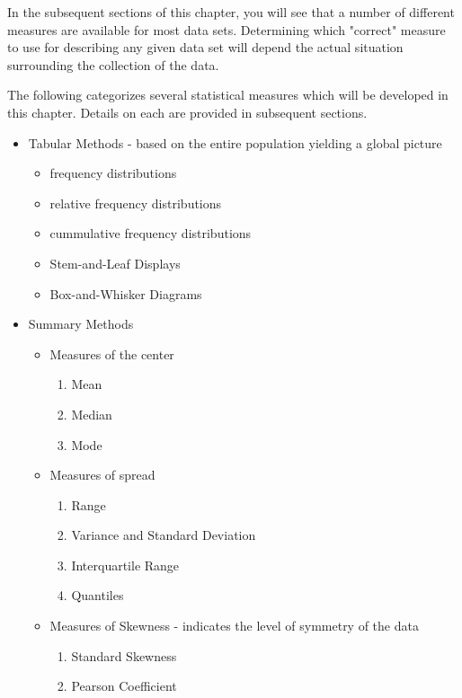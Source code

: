 \documentclass[10pt,]{book}
\theoremstyle{plain}
\theoremstyle{definition}
\theoremstyle{definition}
\theoremstyle{definition}
\numberwithin{equation}{section}
\begin{document}
	In the subsequent sections of this chapter, you will see that a number of different measures are available for most data sets. Determining which "correct" measure to use for describing any given data set will depend the actual situation surrounding the collection of the data.
\par

The following categorizes several statistical measures which will be developed in this chapter. Details on each are provided in subsequent sections.
\leavevmode%
\begin{itemize}[label=\textbullet]
\item{}Tabular Methods - 
	based on the entire population yielding a global picture
\begin{itemize}[label=$\circ$]
\item{}frequency distributions%
\item{}relative frequency distributions%
\item{}cummulative frequency distributions%
\item{}Stem-and-Leaf Displays%
\item{}Box-and-Whisker Diagrams%
\end{itemize}
%
\item{}Summary Methods
\begin{itemize}[label=$\circ$]
\item{}Measures of the center
\begin{enumerate}
\item\hypertarget{li-13}{}Mean%
\item\hypertarget{li-14}{}Median%
\item\hypertarget{li-15}{}Mode%
\end{enumerate}
%
\item{}Measures of spread
\begin{enumerate}
\item\hypertarget{li-17}{}Range%
\item\hypertarget{li-18}{}Variance and Standard Deviation%
\item\hypertarget{li-19}{}Interquartile Range%
\item\hypertarget{li-20}{}Quantiles%
\end{enumerate}
%
\item{}Measures of Skewness 
			- indicates the level of symmetry of the data
\begin{enumerate}
\item\hypertarget{li-22}{}Standard Skewness%
\item\hypertarget{li-23}{}Pearson Coefficient%

\end{enumerate}
\end{itemize}
\end{itemize}
\end{document}

